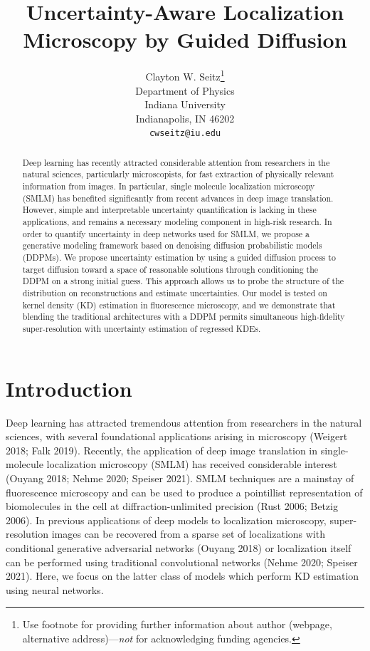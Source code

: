 \documentclass{article}
\title{Uncertainty-Aware Localization Microscopy by Guided Diffusion}
\author{%
  Clayton W. Seitz\thanks{Use footnote for providing further information
    about author (webpage, alternative address)---\emph{not} for acknowledging
    funding agencies.} \\
  Department of Physics\\
  Indiana University\\
  Indianapolis, IN 46202 \\
  \texttt{cwseitz@iu.edu} \\
}
\begin{document}
\maketitle


\begin{abstract}

Deep learning has recently attracted considerable attention from researchers in the natural sciences, particularly microscopists, for fast extraction of physically relevant information from images. In particular, single molecule localization microscopy (SMLM) has benefited significantly from recent advances in deep image translation. However, simple and interpretable uncertainty quantification is lacking in these applications, and remains a necessary modeling component in high-risk research. In order to quantify uncertainty in deep networks used for SMLM, we propose a generative modeling framework based on denoising diffusion probabilistic models (DDPMs). We propose uncertainty estimation by using a guided diffusion process to target diffusion toward a space of reasonable solutions through conditioning the DDPM on a strong initial guess. This approach allows us to probe the structure of the distribution on reconstructions and estimate uncertainties. Our model is tested on kernel density (KD) estimation in fluorescence microscopy, and we demonstrate that blending the traditional architectures with a DDPM permits simultaneous high-fidelity super-resolution with uncertainty estimation of regressed KDEs. 
\end{abstract}

\section{Introduction}

Deep learning has attracted tremendous attention from researchers in the natural sciences, with several foundational applications arising in microscopy (Weigert 2018; Falk 2019). Recently, the application of deep image translation in single-molecule localization microscopy (SMLM) has received considerable interest (Ouyang 2018; Nehme 2020; Speiser 2021). SMLM techniques are a mainstay of fluorescence microscopy and can be used to produce a pointillist representation of biomolecules in the cell at diffraction-unlimited precision (Rust 2006; Betzig 2006). In previous applications of deep models to localization microscopy, super-resolution images can be recovered from a sparse set of localizations with conditional generative adversarial networks (Ouyang 2018) or localization itself can be performed using traditional convolutional networks (Nehme 2020; Speiser 2021). Here, we focus on the latter class of models which perform KD estimation using neural networks. 
\end{document}
